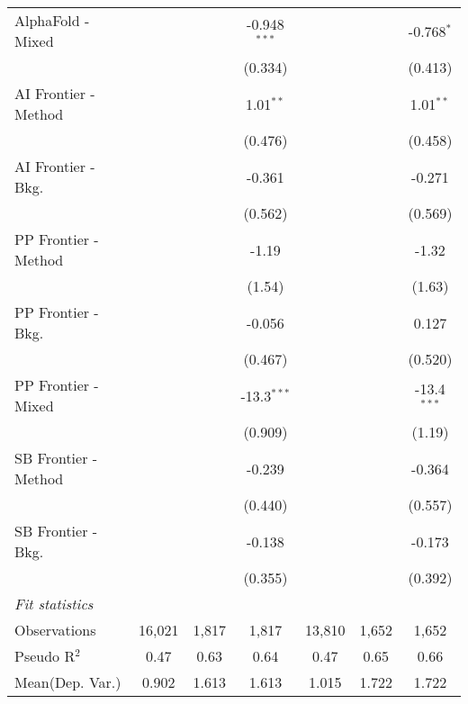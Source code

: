 \begin{tabular}{lcccccc}
   AlphaFold - Mixed    &               &              & -0.948$^{***}$ &              &               & -0.768$^{*}$\\   
                        &               &              & (0.334)        &              &               & (0.413)\\   
   AI Frontier - Method &               &              & 1.01$^{**}$    &              &               & 1.01$^{**}$\\   
                        &               &              & (0.476)        &              &               & (0.458)\\   
   AI Frontier - Bkg.   &               &              & -0.361         &              &               & -0.271\\   
                        &               &              & (0.562)        &              &               & (0.569)\\   
   PP Frontier - Method &               &              & -1.19          &              &               & -1.32\\   
                        &               &              & (1.54)         &              &               & (1.63)\\   
   PP Frontier - Bkg.   &               &              & -0.056         &              &               & 0.127\\   
                        &               &              & (0.467)        &              &               & (0.520)\\   
   PP Frontier - Mixed  &               &              & -13.3$^{***}$  &              &               & -13.4$^{***}$\\   
                        &               &              & (0.909)        &              &               & (1.19)\\   
   SB Frontier - Method &               &              & -0.239         &              &               & -0.364\\   
                        &               &              & (0.440)        &              &               & (0.557)\\   
   SB Frontier - Bkg.   &               &              & -0.138         &              &               & -0.173\\   
                        &               &              & (0.355)        &              &               & (0.392)\\   
   \midrule
   \emph{Fit statistics}\\
   Observations         & 16,021        & 1,817        & 1,817          & 13,810       & 1,652         & 1,652\\  
   Pseudo R$^2$         & 0.47          & 0.63         & 0.64           & 0.47         & 0.65          & 0.66\\  
Mean(Dep. Var.) & 0.902 & 1.613 & 1.613 & 1.015 & 1.722 & 1.722 \\
   

\end{tabular}
